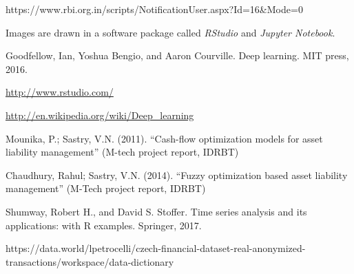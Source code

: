 \begin{thebibliography}{1}
		  https://www.rbi.org.in/scripts/NotificationUser.aspx?Id=16\&Mode=0
		 
		 Images are drawn in a software package called \emph{RStudio} and \emph{Jupyter Notebook}.		 
		 
		 Goodfellow, Ian, Yoshua Bengio, and Aaron Courville. Deep learning. MIT press, 2016.
		 
		 \url{http://www.rstudio.com/}		 
		 
		 \url{http://en.wikipedia.org/wiki/Deep\_learning}		 
		 
		 Mounika, P.; Sastry, V.N. (2011). “Cash-flow optimization models for asset liability management” (M-tech project report, IDRBT) 

		 
		 Chaudhury, Rahul; Sastry, V.N. (2014). “Fuzzy optimization based asset liability management” (M-Tech project report, IDRBT) 

		 
		 Shumway, Robert H., and David S. Stoffer. Time series analysis and its applications: with R examples. Springer, 2017.	
		 
		 https://data.world/lpetrocelli/czech-financial-dataset-real-anonymized-transactions/workspace/data-dictionary
		 
		 
		
\end{thebibliography}
